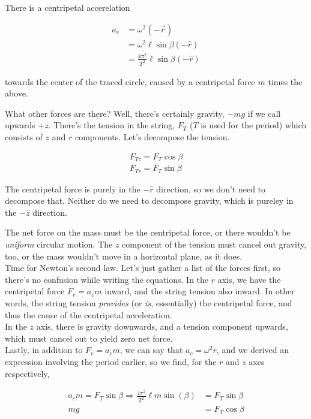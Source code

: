 \documentclass[12pt,a4paper]{report}
\begin{document}
There is a centripetal accerelation 

\begin{align}
a_c &= \omega^2 (-\vec{r})\\
      &= \omega^2 \ell \sin \beta (-\hat{r})\\
      &= \frac{4 \pi^2}{T^2} \ell \sin \beta (-\hat{r})
\end{align}

towards the center of the traced circle, caused by a centripetal force $m$ times the above.

What other forces are there? Well, there's certainly gravity, $-m g$ if we call upwards $+z$. There's the tension in the string, $F_T$ ($T$ is used for the period) which consists of $z$ and $r$ components. Let's decompose the tension.

\begin{align}
F_{Tz} = F_T \cos \beta\\
F_{Tr} = F_T \sin \beta
\end{align}

The centripetal force is purely in the $-\hat{r}$ direction, so we don't need to decompose that. Neither do we need to decompose gravity, which is pureley in the $-\hat{z}$ direction.

The net force on the mass must be the centripetal force, or there wouldn't be \emph{uniform} circular motion. The $z$ component of the tension must cancel out gravity, too, or the mass wouldn't move in a horizontal plane, as it does.\\
Time for Newton's second law. Let's just gather a list of the forces first, so there's no confusion while writing the equations. In the $r$ axis, we have the centripetal force $F_r = a_c m$ inward, and the string tension also inward. In other words, the string tension \emph{provides} (or \emph{is}, essentially) the centripetal force, and thus the cause of the centripetal acceleration.\\
In the $z$ axis, there is gravity downwards, and a tension component upwards, which must cancel out to yield zero net force.\\
Lastly, in addition to $F_r = a_c m$, we can say that $a_c = \omega^2 r$, and we derived an expression involving the period earlier, so we find, for the $r$ and $z$ axes respectively,

\begin{align}
a_c m = F_T \sin \beta \Rightarrow \frac{4\pi^2}{T^2} \ell m \sin (\beta) &= F_T \sin \beta\\
m g &= F_T \cos \beta
\end{align}
\end{document}
